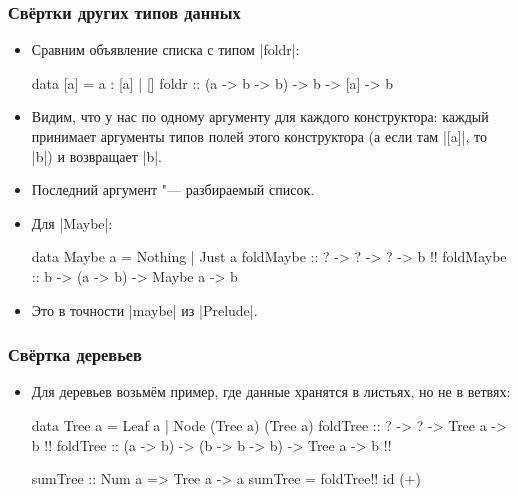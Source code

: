 \documentclass[11pt]{beamer}
\begin{document}
\begin{frame}[fragile]
  \frametitle{Свёртки других типов данных}
  \begin{itemize}
    \item Сравним объявление списка с типом \haskinline|foldr|:
          \begin{haskellsmall}
            data [a] = a : [a]       | []
            foldr ::  (a -> b -> b) -> b -> [a] -> b
          \end{haskellsmall}
    \item Видим, что у нас по одному аргументу для каждого конструктора: каждый принимает аргументы типов полей этого конструктора (а если там \haskinline|[a]|, то \haskinline|b|) и возвращает \haskinline|b|.
    \item Последний аргумент "--- разбираемый список.
    \item Для \haskinline|Maybe|:
          \begin{haskellsmall}
            data Maybe a = Nothing | Just a
            foldMaybe ::   ?      -> ?        -> ?       -> b !\pause!
            foldMaybe ::   b      -> (a -> b) -> Maybe a -> b
          \end{haskellsmall}
          \pause
    \item Это в точности \haskinline|maybe| из \haskinline|Prelude|.
  \end{itemize}
\end{frame}

\begin{frame}[fragile]
  \frametitle{Свёртка деревьев}
  \begin{itemize}
    \item Для деревьев возьмём пример, где данные хранятся в листьях, но не в ветвях:
          \begin{haskellsmall}
            data Tree a = Leaf a | Node (Tree a) (Tree a)
            foldTree   :: ? ->        ?             -> Tree a -> b !\pause!
            foldTree   :: (a -> b) -> (b -> b -> b) -> Tree a -> b !\pause!

            sumTree :: Num a => Tree a -> a
            sumTree = foldTree!\pause! id (+)
          \end{haskellsmall}
  \end{itemize}
\end{frame}
\end{document}
